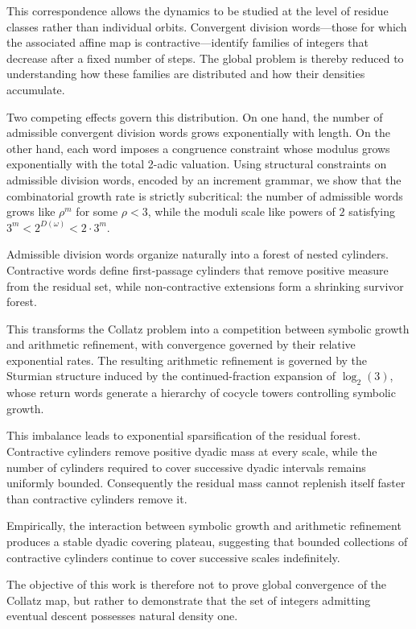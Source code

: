 \documentclass[12pt, oneside]{article}
\numberwithin{equation}{section}
\theoremstyle{definition}
\theoremstyle{plain}
\theoremstyle{remark}
\begin{document}
This correspondence allows the dynamics to be studied at the level of residue classes
rather than individual orbits. Convergent division words—those for which the associated
affine map is contractive—identify families of integers that decrease after a fixed
number of steps. The global problem is thereby reduced to understanding how these
families are distributed and how their densities accumulate.

Two competing effects govern this distribution. On one hand, the number of admissible
convergent division words grows exponentially with length. On the other hand, each word
imposes a congruence constraint whose modulus grows exponentially with the total 2-adic
valuation. Using structural constraints on admissible division words, encoded by an
increment grammar, we show that the combinatorial growth rate is strictly subcritical:
the number of admissible words grows like $\rho^m$ for some $\rho < 3$, while the moduli
scale like powers of $2$ satisfying $3^m < 2^{D(\omega)} < 2\cdot 3^m$.

Admissible division words organize naturally into a forest of nested cylinders. Contractive
words define first-passage cylinders that remove positive measure from the residual set,
while non-contractive extensions form a shrinking survivor forest.

This transforms the Collatz problem into a competition between symbolic growth and
arithmetic refinement, with convergence governed by their relative exponential rates.
The resulting arithmetic refinement is governed by the Sturmian structure induced by the
continued-fraction expansion of $\log_2(3)$, whose return words generate a hierarchy of
cocycle towers controlling symbolic growth.

This imbalance leads to exponential sparsification of the residual forest.
Contractive cylinders remove positive dyadic mass at every scale, while the
number of cylinders required to cover successive dyadic intervals remains
uniformly bounded. Consequently the residual mass cannot replenish itself
faster than contractive cylinders remove it.

Empirically, the interaction between symbolic growth and arithmetic refinement produces
a stable dyadic covering plateau, suggesting that bounded collections of contractive
cylinders continue to cover successive scales indefinitely.

The objective of this work is therefore not to prove global convergence of
the Collatz map, but rather to demonstrate that the set of integers admitting
eventual descent possesses natural density one.
\end{document}
